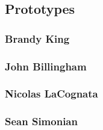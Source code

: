 \subsection{Prototypes}
\subsubsection{Brandy King}

\newpage

\subsubsection{John Billingham}

\newpage

\subsubsection{Nicolas LaCognata}

\newpage

\subsubsection{Sean Simonian}

\newpage
